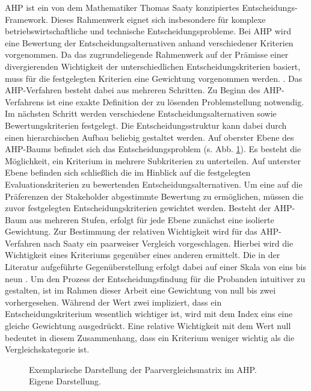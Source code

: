 AHP ist ein von dem Mathematiker Thomas Saaty konzipiertes Entscheidungs-Framework. Dieses Rahmenwerk eignet sich insbesondere für komplexe betriebswirtschaftliche und technische Entscheidungsprobleme. Bei AHP wird eine Bewertung der Entscheidungsalternativen anhand verschiedener Kriterien vorgenommen.  Da das zugrundeliegende Rahmenwerk auf der Prämisse einer divergierenden Wichtigkeit der unterschiedlichen Entscheidungskriterien basiert, muss für die festgelegten Kriterien eine Gewichtung vorgenommen werden. \cite[86]{Saaty.2008}. Das AHP-Verfahren besteht dabei aus mehreren Schritten. Zu Beginn des AHP-Verfahrens ist eine exakte Definition der zu lösenden Problemstellung notwendig. Im nächsten Schritt werden verschiedene Entscheidungsalternativen sowie Bewertungskriterien festgelegt. Die Entscheidungsstruktur kann dabei durch einen hierarchischen Aufbau beliebig gestaltet werden. Auf oberster Ebene des AHP-Baums befindet sich das Entscheidungsproblem (s. Abb. \ref*{fig:AHP_B}). Es besteht die Möglichkeit, ein Kriterium in mehrere Subkriterien zu unterteilen. Auf unterster Ebene befinden sich schließlich die im Hinblick auf die festgelegten Evaluationskriterien zu bewertenden Entscheidungsalternativen. Um eine auf die Präferenzen der Stakeholder abgestimmte Bewertung zu ermöglichen, müssen die zuvor festgelegten Entscheidungskriterien gewichtet werden. Besteht der AHP-Baum aus mehreren Stufen, erfolgt für jede Ebene zunächst eine isolierte Gewichtung. Zur Bestimmung der relativen Wichtigkeit wird für das AHP-Verfahren nach Saaty ein paarweiser Vergleich vorgeschlagen. Hierbei wird die Wichtigkeit eines Kriteriums gegenüber eines anderen ermittelt. Die in der Literatur aufgeführte Gegenüberstellung erfolgt dabei auf einer Skala von eins bis neun \cite[86]{Saaty.2008}. Um den Prozess der Entscheidungsfindung für die Probanden intuitiver zu gestalten, ist im Rahmen dieser Arbeit eine Gewichtung von null bis zwei vorhergesehen. Während der Wert zwei impliziert, dass ein Entscheidungskriterium wesentlich wichtiger ist, wird mit dem Index eins eine gleiche Gewichtung ausgedrückt. Eine relative Wichtigkeit mit dem Wert null bedeutet in diesem Zusammenhang, dass ein Kriterium weniger wichtig als die Vergleichskategorie ist.  
\begin{center}
	\begin{figure}[H]
		\centering
		\caption[Exemplarische Darstellung der Paarvergleichsmatrix im AHP]{Exemplarische Darstellung der Paarvergleichsmatrix im AHP.\\ Eigene Darstellung.}
		\label{fig:AHP_B}
	\end{figure}
\end{center}
